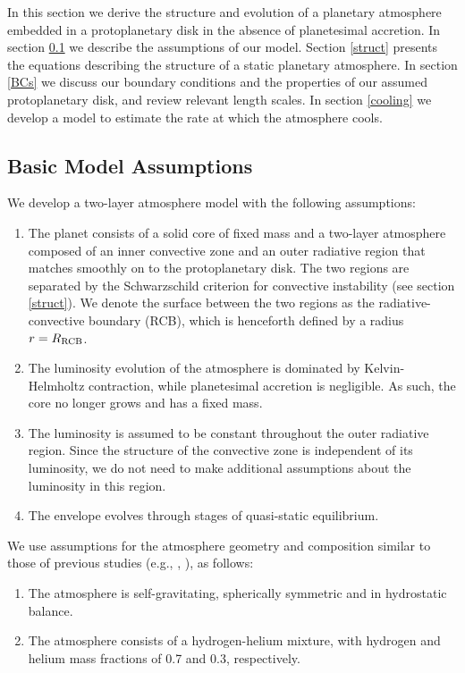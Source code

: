 \documentclass[apj]{emulateapj}
\newcommand{\cb}{_{\rm RCB}}
\begin{document}
In this section we derive the structure and evolution of a planetary atmosphere embedded in a protoplanetary disk in the absence of planetesimal accretion. In section \ref{model} we describe the assumptions of our model. Section \ref{struct} presents the equations describing the structure of a static planetary atmosphere.  In section \ref{BCs} we discuss our boundary conditions and the properties of our assumed protoplanetary disk, and review relevant length scales.  In section \ref{cooling} we develop a model to estimate the rate at which the atmosphere cools. %

\subsection{Basic Model Assumptions}
\label{model}

We develop a two-layer atmosphere model with the following assumptions:

\begin{enumerate}
\item The planet consists of a solid core of fixed mass and a two-layer atmosphere composed of an inner convective zone and an outer radiative region that matches smoothly on to the protoplanetary disk. The two regions are separated by the Schwarzschild criterion for convective instability (see section \ref{struct}). We denote the surface between the two regions as the radiative-convective boundary (RCB), which is henceforth defined by a radius $r=R\cb$.
\item The luminosity evolution of the atmosphere is dominated by Kelvin-Helmholtz contraction, while planetesimal accretion is negligible. As such, the core no longer grows and has a fixed mass.
\item The luminosity is assumed to be constant throughout the outer radiative region. Since the structure of the convective zone is independent of its luminosity, we do not need to make additional assumptions about the luminosity in this region.
\item The envelope evolves through stages of quasi-static equilibrium.
\end{enumerate} 

We use assumptions for the atmosphere geometry and composition similar to those of previous studies (e.g., \citealt{ikoma00}, \citealt{pn05}), as follows:

\begin{enumerate}
\item The atmosphere is self-gravitating, spherically symmetric and in hydrostatic balance.
\item The atmosphere consists of a hydrogen-helium mixture, with hydrogen and helium mass fractions of 0.7 and 0.3, respectively.
\end{enumerate}
\end{document}
